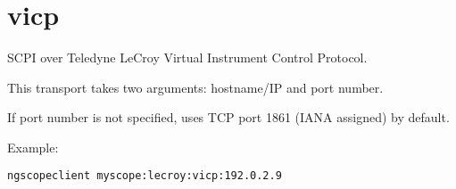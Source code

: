 \section{vicp}

SCPI over Teledyne LeCroy Virtual Instrument Control Protocol.

This transport takes two arguments: hostname/IP and port number.

If port number is not specified, uses TCP port 1861 (IANA assigned) by default.

Example:
\begin{lstlisting}[language=sh, numbers=none]
ngscopeclient myscope:lecroy:vicp:192.0.2.9
\end{lstlisting}


